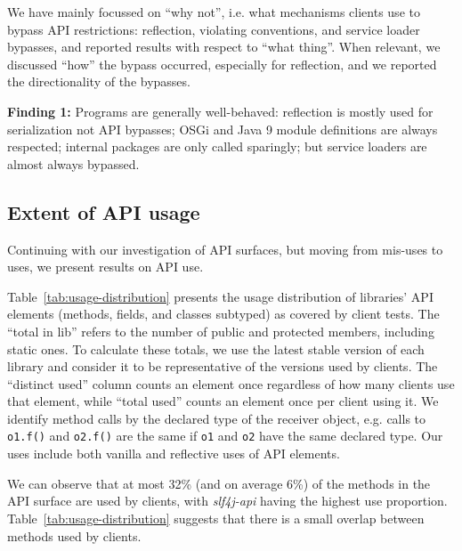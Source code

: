 We have mainly focussed on ``why not'', i.e. what mechanisms clients use to bypass API restrictions: reflection, violating conventions, and service loader bypasses, and reported results with respect to ``what thing''. When relevant, we discussed ``how'' the bypass occurred, especially for reflection, and we reported the directionality of the bypasses.

\begin{mdframed}[
  leftmargin=\parindent,
  rightmargin=\parindent,
  skipabove=\topsep,
  skipbelow=\topsep
  ]
{\bf Finding 1:} Programs are generally well-behaved: reflection is mostly used for serialization not API bypasses; OSGi and Java 9 module definitions are always respected; internal packages are only called sparingly; but service loaders are almost always bypassed.
\end{mdframed}

\subsection{Extent of API usage}
Continuing with our investigation of API surfaces, but moving from
mis-uses to uses, we present results on API use.

Table~\ref{tab:usage-distribution} presents the usage distribution of
libraries' API elements (methods, fields, and classes subtyped) as
covered by client tests. The ``total in lib'' refers to the number of
public and protected members, including static ones. To calculate these totals,
we use the latest stable version of each library and consider it to be representative of 
the versions used by clients.  The ``distinct used'' column counts an
element once regardless of how many clients use that element, while
``total used'' counts an element once per client using it. We identify method calls by the
declared type of the receiver object, e.g. calls to {\tt o1.f()} and {\tt o2.f()} are the same
if {\tt o1} and {\tt o2} have the same declared type.
Our uses 
include both vanilla and reflective uses of API elements.



We can observe that at most 32\% (and on average 6\%) of the methods in the API surface
are used by clients, with \emph{slf4j-api} having the highest use proportion.
Table~\ref{tab:usage-distribution} suggests that there is a small overlap between methods
used by clients.

